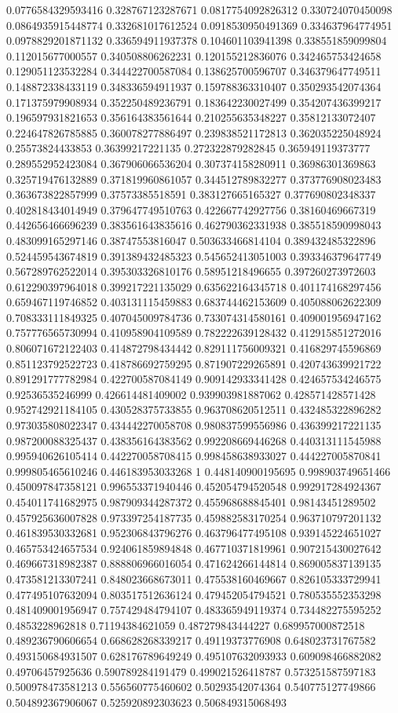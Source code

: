 \begin{table}
\begin{tabu}
\begin{sparkline}{10}
0.0776584329593416 0.328767123287671 0.0817754092826312 0.330724070450098 0.0864935915448774 0.332681017612524 0.0918530950491369 0.334637964774951 0.0978829201871132 0.336594911937378 0.104601103941398 0.338551859099804 0.112015677000557 0.340508806262231 0.120155212836076 0.342465753424658 0.129051123532284 0.344422700587084 0.138625700596707 0.346379647749511 0.148872338433119 0.348336594911937 0.159788363310407 0.350293542074364 0.171375979908934 0.352250489236791 0.183642230027499 0.354207436399217 0.196597931821653 0.356164383561644 0.210255635348227 0.35812133072407 0.224647826785885 0.360078277886497 0.239838521172813 0.362035225048924 0.25573824433853 0.36399217221135 0.272322879282845 0.365949119373777 0.289552952423084 0.367906066536204 0.307374158280911 0.36986301369863 0.325719476132889 0.371819960861057 0.344512789832277 0.373776908023483 0.363673822857999 0.37573385518591 0.383127665165327 0.377690802348337 0.402818434014949 0.379647749510763 0.422667742927756 0.38160469667319 0.442656466696239 0.383561643835616 0.462790362331938 0.385518590998043 0.483099165297146 0.38747553816047 0.503633466814104 0.389432485322896 0.524459543674819 0.391389432485323 0.545652413051003 0.393346379647749 0.567289762522014 0.395303326810176 0.58951218496655 0.397260273972603 0.612290397964018 0.399217221135029 0.635622164345718 0.401174168297456 0.659467119746852 0.403131115459883 0.683744462153609 0.405088062622309 0.708333111849325 0.407045009784736 0.733074314580161 0.409001956947162 0.757776565730994 0.410958904109589 0.782222639128432 0.412915851272016 0.806071672122403 0.414872798434442 0.829111756009321 0.416829745596869 0.851123792522723 0.418786692759295 0.871907229265891 0.420743639921722 0.891291777782984 0.422700587084149 0.909142933341428 0.424657534246575 0.92536535246999 0.426614481409002 0.939903981887062 0.428571428571428 0.952742921184105 0.430528375733855 0.963708620512511 0.432485322896282 0.973035808022347 0.434442270058708 0.980837599556986 0.436399217221135 0.987200088325437 0.438356164383562 0.992208669446268 0.440313111545988 0.995940626105414 0.442270058708415 0.998458638933027 0.444227005870841 0.999805465610246 0.446183953033268 1 0.448140900195695 0.998903749651466 0.450097847358121 0.996553371940446 0.452054794520548 0.992917284924367 0.454011741682975 0.987909344287372 0.455968688845401 0.98143451289502 0.457925636007828 0.973397254187735 0.459882583170254 0.963710797201132 0.461839530332681 0.952306843796276 0.463796477495108 0.939145224651027 0.465753424657534 0.924061859894848 0.467710371819961 0.907215430027642 0.469667318982387 0.888806966016054 0.471624266144814 0.869005837139135 0.473581213307241 0.848023668673011 0.475538160469667 0.826105333729941 0.477495107632094 0.803517512636124 0.479452054794521 0.780535552353298 0.481409001956947 0.757429484794107 0.483365949119374 0.734482275595252 0.4853228962818 0.71194384621059 0.487279843444227 0.689957000872518 0.489236790606654 0.668628268339217 0.49119373776908 0.648023731767582 0.493150684931507 0.628176789649249 0.495107632093933 0.609098466882082 0.49706457925636 0.590789284191479 0.499021526418787 0.573251587597183 0.500978473581213 0.556560775460602 0.50293542074364 0.540775127749866 0.504892367906067 0.525920892303623 0.506849315068493 
\end{sparkline}
\end{tabu}
\end{table}
